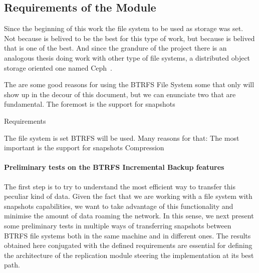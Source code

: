 \subsection{Requirements of the Module}
\label{sub:requirements_icbdrep}

Since the beginning of this work the file system to be used as storage was set. Not because is belived to be the best for this type of work, but because is belived that is one of the best. And since the grandure of the project there is an analogous thesis doing work with other type of file systems, a distributed object storage oriented one named Ceph~\cite{Weil2006}.


The are some good reasons for using the BTRFS File System some that only will show up in the decour of this document, but we can enunciate two that are fundamental. The foremost is the support for snapshots

Requirements

The file system is set BTRFS will be used.
Many reasons for that:
The most important is the support for snapshots
Compression


\paragraph{Preliminary tests on the BTRFS Incremental Backup features}
\label{subsub:pre_test_btrfs}


The first step is to try to understand the most efficient way to transfer this peculiar kind of data. Given the fact that we are working with a file system with snapshots capabilities, we want to take advantage of this functionality and minimise the amount of data roaming the network. In this sense, we next present some preliminary tests in multiple ways of transferring snapshots between BTRFS file systems both in the same machine and in different ones.
The results obtained here conjugated with the defined requirements are essential for defining the architecture of the replication module steering the implementation at its best path.

